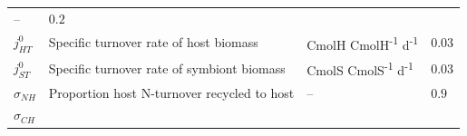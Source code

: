 \documentclass[]{elsarticle} %
\begin{document}
\begin{longtable}[c]{@{}llll@{}}
\begin{minipage}[t]{0.25\columnwidth}
--
\strut\end{minipage} &
\begin{minipage}[t]{0.10\columnwidth}\raggedright\strut
\(0.2\)
\strut\end{minipage}\tabularnewline
\begin{minipage}[t]{0.10\columnwidth}\raggedright\strut
\(j_{HT}^0\)
\strut\end{minipage} &
\begin{minipage}[t]{0.48\columnwidth}\raggedright\strut
Specific turnover rate of host biomass
\strut\end{minipage} &
\begin{minipage}[t]{0.25\columnwidth}\raggedright\strut
CmolH CmolH\textsuperscript{-1} d\textsuperscript{-1}
\strut\end{minipage} &
\begin{minipage}[t]{0.10\columnwidth}\raggedright\strut
\(0.03\)
\strut\end{minipage}\tabularnewline
\begin{minipage}[t]{0.10\columnwidth}\raggedright\strut
\(j_{ST}^0\)
\strut\end{minipage} &
\begin{minipage}[t]{0.48\columnwidth}\raggedright\strut
Specific turnover rate of symbiont biomass
\strut\end{minipage} &
\begin{minipage}[t]{0.25\columnwidth}\raggedright\strut
CmolS CmolS\textsuperscript{-1} d\textsuperscript{-1}
\strut\end{minipage} &
\begin{minipage}[t]{0.10\columnwidth}\raggedright\strut
\(0.03\)
\strut\end{minipage}\tabularnewline
\begin{minipage}[t]{0.10\columnwidth}\raggedright\strut
\(\sigma_{NH}\)
\strut\end{minipage} &
\begin{minipage}[t]{0.48\columnwidth}\raggedright\strut
Proportion host N-turnover recycled to host
\strut\end{minipage} &
\begin{minipage}[t]{0.25\columnwidth}\raggedright\strut
--
\strut\end{minipage} &
\begin{minipage}[t]{0.10\columnwidth}\raggedright\strut
\(0.9\)
\strut\end{minipage}\tabularnewline
\begin{minipage}[t]{0.10\columnwidth}\raggedright\strut
\(\sigma_{CH}\)

\end{minipage}
\end{longtable}
\end{document}
